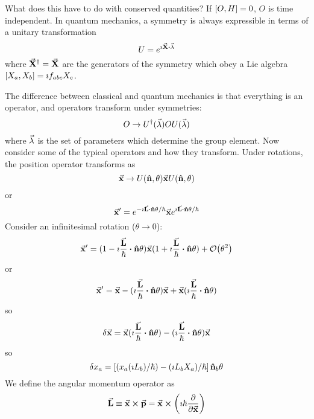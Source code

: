 \documentclass[a4paper,twoside,master.tex]{subfiles}
\begin{document}
What does this have to do with conserved quantities? If $ \comm{O}{H} = 0 $, $ O $ is time independent. In quantum mechanics, a symmetry is always expressible in terms of a unitary transformation
\begin{equation}
    U = e^{\imath\va{ X} \vdot \va{\lambda}}
\end{equation}
where $\va{ X}^\dagger =\va{ X} $ are the generators of the symmetry which obey a Lie algebra $ \comm{X_a}{X_b} = \imath f_{abc} X_c $.

The difference between classical and quantum mechanics is that everything is an operator, and operators transform under symmetries:
\begin{equation}
    O \to U^\dagger(\va{\lambda}) O U(\va{\lambda})
\end{equation}
where $ \va{\lambda} $ is the set of parameters which determine the group element. Now consider some of the typical operators and how they transform. Under rotations, the position operator transforms as
\begin{equation}
    \va{ x} \to U(\vu{n}, \theta)\va{ x} U(\vu{n}, \theta)
\end{equation}
or
\begin{equation}
    \va{ x}' = e^{- \imath\va{ L} \vdot\vu{ n} \theta/\hbar}\va{ x} e^{\imath\va{ L} \vdot\vu{ n} \theta/\hbar}
\end{equation}
Consider an infinitesimal rotation ($ \theta \to 0 $):
\begin{equation}
    \va{ x}' = (1 - \imath\frac{\va{ L}}{\hbar} \vdot\vu{ n} \theta)\va{ x} (1 + \imath\frac{\va{ L}}{\hbar} \vdot\vu{ n} \theta) + \order{\theta^2}
\end{equation}
or
\begin{equation}
    \va{ x}' =\va{ x} - (\imath\frac{\va{ L}}{\hbar} \vdot\vu{ n} \theta)\va{ x} +\va{ x} (\imath\frac{\va{ L}}{\hbar} \vdot\vu{ n} \theta)
\end{equation}
so
\begin{equation}
    \delta\va{ x} =\va{ x} (\imath\frac{\va{ L}}{\hbar} \vdot\vu{ n} \theta) - (\imath\frac{\va{ L}}{\hbar} \vdot\vu{ n} \theta)\va{ x}
\end{equation}
so
\begin{equation}
    \delta x_a = \left[ (x_a (\imath L_b)/\hbar) - (\imath L_b X_a )/\hbar\right]\vu{ n}_b \theta
\end{equation}
We define the angular momentum operator as
\begin{equation}
    \va{ L} \equiv\va{ x} \cross\va{ p} =\va{ x} \cross \left( \imath \hbar \pdv{\va{x}} \right)
\end{equation}
\end{document}
